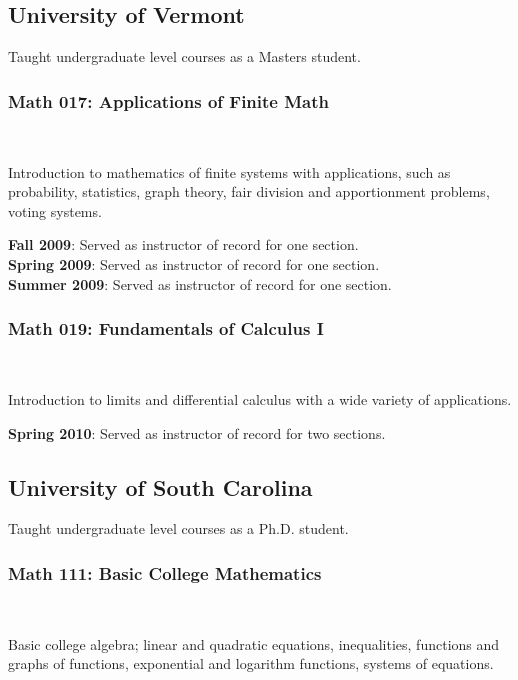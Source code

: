 \documentclass[teaching.portfolio.tex]{subfiles}
\begin{document}
\subsection{University of Vermont}
Taught undergraduate level courses as a Masters student.
\subsubsection{Math 017: Applications of Finite Math}\hfill\\

\begin{tcolorbox}
  \begin{desc}
    Introduction to mathematics of finite systems with applications, such as probability, statistics, graph theory, fair division and apportionment problems, voting systems.
  \end{desc}
\end{tcolorbox}
\noindent
\textbf{Fall 2009}: Served as instructor of record for one section.\\
\textbf{Spring 2009}: Served as instructor of record for one section.\\
\textbf{Summer 2009}: Served as instructor of record for one section.
\subsubsection{Math 019: Fundamentals of Calculus I}\hfill\\
\begin{tcolorbox}
  \begin{desc}
    Introduction to limits and differential calculus with a wide variety of applications.
  \end{desc}
\end{tcolorbox}

\noindent
\textbf{Spring 2010}: Served as instructor of record for two sections.
\subsection{University of South Carolina}
Taught undergraduate level courses as a Ph.D. student.
\subsubsection{Math 111: Basic College Mathematics}\hfill\\
\begin{tcolorbox}
  \begin{desc}
    Basic college algebra; linear and quadratic equations, inequalities, functions and graphs of functions, exponential and logarithm functions, systems of equations.
  \end{desc}
\end{tcolorbox}
\end{document}
